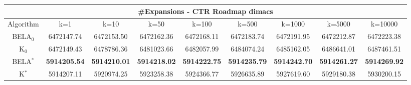 \begin{tabular}{c|cccccccc}\toprule
\multicolumn{9}{c}{#Expansions - CTR Roadmap dimacs}\\ \midrule
Algorithm & k=1 & k=10 & k=50 & k=100 & k=500 & k=1000 & k=5000 & k=10000 \\ \midrule
BELA$_0$ & 6472147.74 & 6472153.50 & 6472162.36 & 6472168.11 & 6472183.74 & 6472191.95 & 6472212.87 & 6472223.38 \\
K$_0$ & 6472149.43 & 6478786.36 & 6481023.66 & 6482057.99 & 6484074.24 & 6485162.05 & 6486641.01 & 6487461.51 \\
BELA$^*$ & \textbf{5914205.54} & \textbf{5914210.01} & \textbf{5914218.02} & \textbf{5914222.75} & \textbf{5914235.79} & \textbf{5914242.70} & \textbf{5914261.27} & \textbf{5914269.92} \\
K$^*$ & 5914207.11 & 5920974.25 & 5923258.38 & 5924366.77 & 5926635.89 & 5927619.60 & 5929180.38 & 5930200.15 \\ \bottomrule 
\end{tabular}

